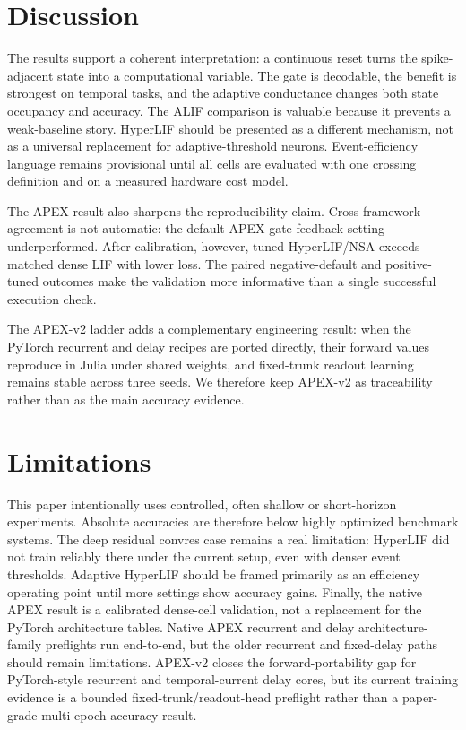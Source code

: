 \documentclass[journal]{IEEEtran}
\newcommand{\hlif}{HyperLIF}
\newcommand{\lif}{LIF}
\newcommand{\alif}{ALIF}
\newcommand{\apex}{APEX}
\begin{document}
\section{Discussion}
The results support a coherent interpretation: a continuous reset turns the spike-adjacent state into a computational variable. The gate is decodable, the benefit is strongest on temporal tasks, and the adaptive conductance changes both state occupancy and accuracy. The \alif{} comparison is valuable because it prevents a weak-baseline story. \hlif{} should be presented as a different mechanism, not as a universal replacement for adaptive-threshold neurons. Event-efficiency language remains provisional until all cells are evaluated with one crossing definition and on a measured hardware cost model.

The \apex{} result also sharpens the reproducibility claim. Cross-framework agreement is not automatic: the default \apex{} gate-feedback setting underperformed. After calibration, however, tuned \hlif{}/NSA exceeds matched dense \lif{} with lower loss. The paired negative-default and positive-tuned outcomes make the validation more informative than a single successful execution check.

The \apex{}-v2 ladder adds a complementary engineering result: when the PyTorch recurrent and delay recipes are ported directly, their forward values reproduce in Julia under shared weights, and fixed-trunk readout learning remains stable across three seeds. We therefore keep \apex{}-v2 as traceability rather than as the main accuracy evidence.

\section{Limitations}
This paper intentionally uses controlled, often shallow or short-horizon experiments. Absolute accuracies are therefore below highly optimized benchmark systems. The deep residual convres case remains a real limitation: \hlif{} did not train reliably there under the current setup, even with denser event thresholds. Adaptive \hlif{} should be framed primarily as an efficiency operating point until more settings show accuracy gains. Finally, the native \apex{} result is a calibrated dense-cell validation, not a replacement for the PyTorch architecture tables. Native \apex{} recurrent and delay architecture-family preflights run end-to-end, but the older recurrent and fixed-delay paths should remain limitations. \apex{}-v2 closes the forward-portability gap for PyTorch-style recurrent and temporal-current delay cores, but its current training evidence is a bounded fixed-trunk/readout-head preflight rather than a paper-grade multi-epoch accuracy result.
\end{document}
